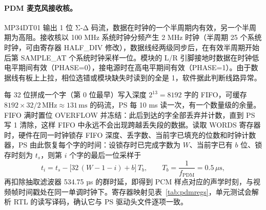 \paragraph{PDM 麦克风接收核。}MP34DT01 输出 1 位 Σ-Δ 码流\cite{mp34dt01}，数据在时钟的一个半周期内有效，另一个半周期为高阻。接收核以 100 MHz 系统时钟分频产生 2 MHz 时钟（半周期 25 个系统时钟，可由寄存器 HALF\_DIV 修改），数据线经两级同步后，在有效半周期开始后第 SAMPLE\_AT 个系统时钟采样一位。模块的 L/R 引脚接地时数据在时钟低电平期间有效（PHASE=0），接电源时在高电平期间有效（PHASE=1）。由于数据线有板上上拉，相位选错或模块缺失时读到的全是 1，软件据此判断线路异常。

每 32 位拼成一个字（第 0 位最早）写入深度 $2^{13}=8192$ 字的 FIFO，可缓存 $8192\times32/2\,\mathrm{MHz}\approx131\,\mathrm{ms}$ 的码流，PS 每 10 ms 读一次，有一个数量级的余量。FIFO 满时置位 OVERFLOW 并冻结：此后到达的字全部丢弃并计数，直到 PS 写 1 清除，这样 FIFO 中永远不会出现跨越丢失段的数据。读取 WORDS 寄存器时，硬件在同一时钟锁存 FIFO 深度、丢字数、当前字已填充的位数和时钟计数器，PS 由此恢复每个字的时间：设锁存时已完成字数为 $W$、当前字已有 $b$ 位、锁存时刻为 $t_s$，则第 $i$ 个字的最后一位采样于
\begin{equation}
t_i=t_s-\bigl[32\,(W-1-i)+b\bigr]\,T_b,\qquad T_b=\frac{1}{f_{\mathrm{PDM}}}=0.5\,\mu\mathrm{s},
\end{equation}
再扣除抽取滤波器 534.75 µs 的群时延，即得到 PCM 样点对应的声学时刻，与视频帧时间戳处在同一单调时钟下。寄存器映射见表~\ref{tab:pdmregs}，单元测试会解析 RTL 的读写译码，确认它与 PS 驱动头文件逐项一致。

